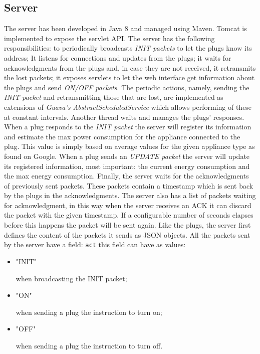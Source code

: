 \documentclass[conference]{IEEEtran}
\begin{document}
\subsection{Server}\label{SVR}
The server has been developed in Java 8 and managed using Maven. Tomcat is implemented to expose the servlet API. The server has the following responsibilities: to periodically broadcasts \textit{INIT packets} to let the plugs know its address; It listens for connections and updates from the plugs; it waits for acknowledgments from the plugs and, in case they are not received, it retransmits the lost packets; it exposes servlets to let the web interface get information about the plugs and send \textit{ON/OFF packets}. The periodic actions, namely, sending the \textit{INIT packet} and retransmitting those that are lost, are implemented as extensions of \textit{Guava's AbstractScheduledService} which allows performing of these at constant intervals. Another thread waits and manages the plugs' responses. When a plug responds to the \textit{INIT packet} the server will register its information and estimate the max power consumption for the appliance connected to the plug. This value is simply based on average values for the given appliance type as found on Google. When a plug sends an \textit{UPDATE packet} the server will update its registered information, most important: the current energy consumption and the max energy consumption. Finally, the server waits for the acknowledgments of previously sent packets. These packets contain a timestamp which is sent back by the plugs in the acknowledgments. The server also has a list of packets waiting for acknowledgment, in this way when the server receives an ACK it can discard the packet with the given timestamp. If a configurable number of seconds elapses before this happens the packet will be sent again. Like the plugs, the server first defines the content of the packets it sends as JSON objects. All the packets sent by the server have a field: \verb|act| this field can have as values:
\begin{itemize}
	\item \begin{spverbatim}"INIT"\end{spverbatim} when broadcasting the INIT packet;
	\item \begin{spverbatim}"ON"\end{spverbatim} when sending a plug the instruction to turn on;
	\item \begin{spverbatim}"OFF"\end{spverbatim} when sending a plug the instruction to turn off.
\end{itemize}
\end{document}
